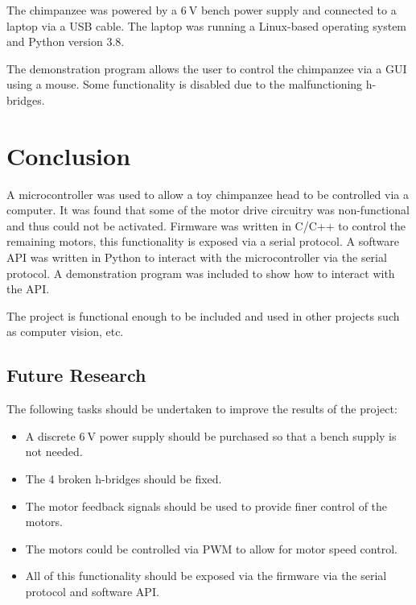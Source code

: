 \documentclass[11pt]{article} %
\begin{document}
The chimpanzee was powered by a $\SI{6}{\volt}$ bench power supply and connected to a laptop via a USB cable.
The laptop was running a Linux-based operating system and Python version 3.8.

The demonstration program allows the user to control the chimpanzee via a GUI using a mouse. Some functionality is disabled due to the malfunctioning h-bridges.

\section{Conclusion}

A microcontroller was used to allow a toy chimpanzee head to be controlled via a computer.
It was found that some of the motor drive circuitry was non-functional and thus could not be activated.
Firmware was written in C/C++ to control the remaining motors, this functionality is exposed via a serial protocol.
A software API was written in Python to interact with the microcontroller via the serial protocol.
A demonstration program was included to show how to interact with the API.

The project is functional enough to be included and used in other projects such as computer vision, etc.

\subsection{Future Research}

The following tasks should be undertaken to improve the results of the project:
\begin{itemize}
	\item A discrete $\SI{6}{\volt}$ power supply should be purchased so that a bench supply is not needed.
	\item The 4 broken h-bridges should be fixed.
	\item The motor feedback signals should be used to provide finer control of the motors.
	\item The motors could be controlled via PWM to allow for motor speed control.
	\item All of this functionality should be exposed via the firmware via the serial protocol and software API.
\end{itemize}
\end{document}
